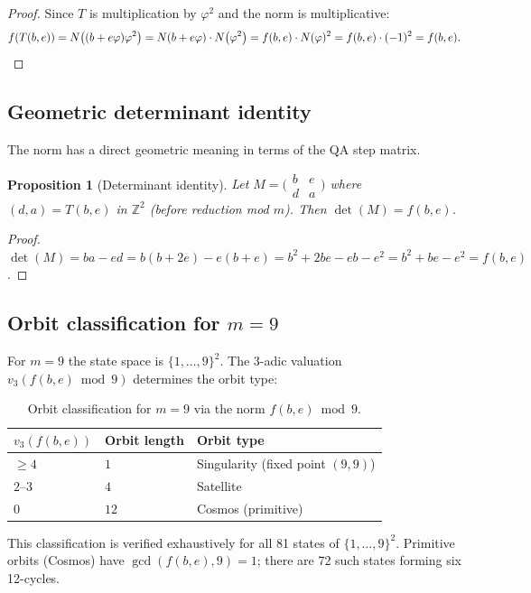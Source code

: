 \documentclass[11pt]{article}
\newtheorem{proposition}[theorem]{Proposition}
\theoremstyle{definition}
\theoremstyle{remark}
\newcommand{\Nm}[1]{N\!\left(#1\right)}
\begin{document}
\begin{proof}
Since $T$ is multiplication by $\varphi^2$ and the norm is multiplicative:
\[
  f(T(b,e)) = \Nm{(b+e\varphi)\varphi^2}
            = \Nm{b+e\varphi}\cdot\Nm{\varphi^2}
            = f(b,e)\cdot N(\varphi)^2
            = f(b,e)\cdot(-1)^2
            = f(b,e). \qedhere
\]
\end{proof}

\subsection{Geometric determinant identity}

The norm has a direct geometric meaning in terms of the QA step matrix.

\begin{proposition}[Determinant identity]
\label{prop:det}
Let $M=\bigl(\begin{smallmatrix}b&e\\d&a\end{smallmatrix}\bigr)$ where $(d,a)=T(b,e)$
in $\mathbb{Z}^2$ (before reduction mod $m$).  Then $\det(M)=f(b,e)$.
\end{proposition}

\begin{proof}
$\det(M)=ba-ed=b(b+2e)-e(b+e)=b^2+2be-eb-e^2=b^2+be-e^2=f(b,e)$.
\end{proof}

\subsection{Orbit classification for $m=9$}

For $m=9$ the state space is $\{1,\ldots,9\}^2$.
The 3-adic valuation $v_3(f(b,e)\bmod 9)$ determines the orbit type:

\begin{table}[h]
\centering
\caption{Orbit classification for $m=9$ via the norm $f(b,e)\bmod 9$.}
\begin{tabular}{lll}
\toprule
$v_3(f(b,e))$ & Orbit length & Orbit type \\
\midrule
$\geq 4$ & $1$  & Singularity (fixed point $(9,9)$) \\
$2$--$3$ & $4$  & Satellite \\
$0$      & $12$ & Cosmos (primitive) \\
\bottomrule
\end{tabular}
\label{tab:orbits}
\end{table}

This classification is verified exhaustively for all 81 states of
$\{1,\ldots,9\}^2$.  Primitive orbits (Cosmos) have $\gcd(f(b,e),9)=1$;
there are 72 such states forming six 12-cycles.
\end{document}
